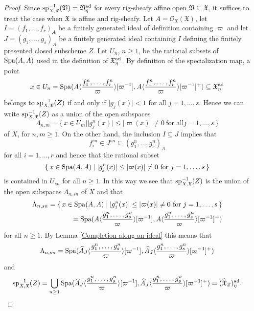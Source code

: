 \documentclass[12pt,twoside,a4paper]{article}
\theoremstyle{definition}
\theoremstyle{remark}
\newcommand\ad{{\rm ad}}
\newcommand\spc{{\rm sp}}
\newcommand\Spa{{\rm Spa}}
\begin{document}
\begin{proof}Since $\spc_{X,\mathfrak{X}}^{-1}(\mathfrak{V})=\mathfrak{V}_{\eta}^{\ad}$ for every rig-sheafy affine open $\mathfrak{V}\subseteq \mathfrak{X}$, it suffices to treat the case when $\mathfrak{X}$ is affine and rig-sheafy. Let $A=\mathcal{O}_{\mathfrak{X}}(\mathfrak{X})$, let $I=(f_1,\dots,f_r)_{A}$ be a finitely generated ideal of definition containing $\varpi$ and let $J=(g_1,\dots,g_s)_{A}$ be a finitely generated ideal containing $I$ defining the finitely presented closed subscheme $Z$. Let $U_{n}$, $n\geq1$, be the rational subsets of $\Spa(A, A)$ used in the definition of $\mathfrak{X}_{\eta}^{\ad}$. By definition of the specialization map, a point \begin{equation*}x\in U_{n}=\Spa(A\langle\frac{f_1^{n},\dots,f_r^{n}}{\varpi}\rangle[\varpi^{-1}], A\langle\frac{f_1^{n},\dots,f_r^{n}}{\varpi}\rangle[\varpi^{-1}]^{+})\subseteq \mathfrak{X}_{\eta}^{\ad}\end{equation*}belongs to $\spc_{X,\mathfrak{X}}^{-1}(Z)$ if and only if $\vert g_{j}(x)\vert<1$ for all $j=1,\dots, s$. Hence we can write $\spc_{X,\mathfrak{X}}^{-1}(Z)$ as a union of the open subspaces\begin{equation*}\Lambda_{n,m}=\{\, x\in U_{m}\mid \vert g_{j}^{n}(x)\vert\leq\vert\varpi(x)\vert\neq 0 \ \text{for all} j=1,\dots, s\,\}\end{equation*}of $X$, for $n, m\geq1$. On the other hand, the inclusion $I\subseteq J$ implies that \begin{equation*}f_{i}^{sn}\in J^{sn}\subseteq (g_1^{n},\dots,g_s^{n})_{A}\end{equation*}for all $i=1,\dots, r$ and hence that the rational subset \begin{equation*}\{\, x\in \Spa(A, A)\mid \vert g_{j}^{n}(x)\vert\leq\vert\varpi(x)\vert\neq 0\ \text{for} \ j=1,\dots,s\,\}\end{equation*}is contained in $U_{sn}$ for all $n\geq1$. In this way we see that $\spc_{X,\mathfrak{X}}^{-1}(Z)$ is the union of the open subspaces $\Lambda_{n,sn}$ of $X$ and that \begin{align*}\Lambda_{n,sn}=\{\, x\in \Spa(A, A)\mid \vert g_{j}^{n}(x)\vert\leq\vert\varpi(x)\vert\neq 0\ \text{for} \ j=1,\dots,s\,\} \\=\Spa(A\langle\frac{g_1^{n},\dots,g_s^{n}}{\varpi}\rangle[\varpi^{-1}], A\langle\frac{g_1^{n},\dots,g_s^{n}}{\varpi}\rangle[\varpi^{-1}]^{+})\end{align*}for all $n\geq1$. By Lemma \ref{Completion along an ideal} this means that \begin{equation*}\Lambda_{n,sn}=\Spa(\widehat{A}_{J}\langle\frac{g_1^{n},\dots,g_s^{n}}{\varpi}\rangle[\varpi^{-1}], \widehat{A}_{J}\langle\frac{g_1^{n},\dots,g_s^{n}}{\varpi}\rangle[\varpi^{-1}]^{+})\end{equation*}and \begin{equation*}\spc_{X,\mathfrak{X}}^{-1}(Z)=\bigcup_{n\geq1}\Spa(\widehat{A}_{J}\langle\frac{g_1^{n},\dots,g_s^{n}}{\varpi}\rangle[\varpi^{-1}], \widehat{A}_{J}\langle\frac{g_1^{n},\dots,g_s^{n}}{\varpi}\rangle[\varpi^{-1}]^{+})=(\widehat{\mathfrak{X}}_{Z})_{\eta}^{\ad}.\end{equation*}\end{proof}
\end{document}

